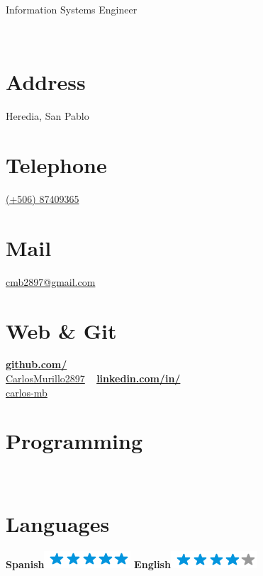 \documentclass[]{friggeri-cv}
\begin{document}
      {Information Systems Engineer}
      

\begin{aside}
    ~
  \section{Address}
    Heredia, San Pablo
    ~
  \section{Telephone}
  \href{tel:87409365}{(+506) 87409365}
    ~
  \section{Mail}
    \href{mailto:cmb2897@gmail.com}{cmb2897@gmail.com}
    ~
  \section{Web \& Git}
    \href{https://github.com/CarlosMurillo2897/}{\textbf{github.com/}\\CarlosMurillo2897}
    ~
    \href{https://www.linkedin.com/in/carlos-mb/}{\textbf{linkedin.com/in/}\\carlos-mb}
    ~
  \section{Programming}
    ~
    \section{Languages}
    \textbf{Spanish}\includegraphics[scale=0.40]{img/5stars.png}
    \textbf{English}\includegraphics[scale=0.40]{img/4stars.png}
    ~

\end{aside}
\end{document}
